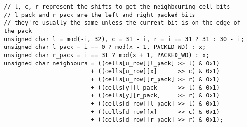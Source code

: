 \begin{verbatim}
// l, c, r represent the shifts to get the neighbouring cell bits
// l_pack and r_pack are the left and right packed bits
// they're usually the same unless the current bit is on the edge of the pack
unsigned char l = mod(-i, 32), c = 31 - i, r = i == 31 ? 31 : 30 - i;
unsigned char l_pack = i == 0 ? mod(x - 1, PACKED_WD) : x;
unsigned char r_pack = i == 31 ? mod(x + 1, PACKED_WD) : x;
unsigned char neighbours = ((cells[u_row][l_pack] >> l) & 0x1) 
                         + ((cells[u_row][x]      >> c) & 0x1) 
                         + ((cells[u_row][r_pack] >> r) & 0x1)
                         + ((cells[y][l_pack]     >> l) & 0x1)
                         + ((cells[y][r_pack]     >> r) & 0x1)
                         + ((cells[d_row][l_pack] >> l) & 0x1) 
                         + ((cells[d_row][x]      >> c) & 0x1) 
                         + ((cells[d_row][r_pack] >> r) & 0x1);
\end{verbatim}